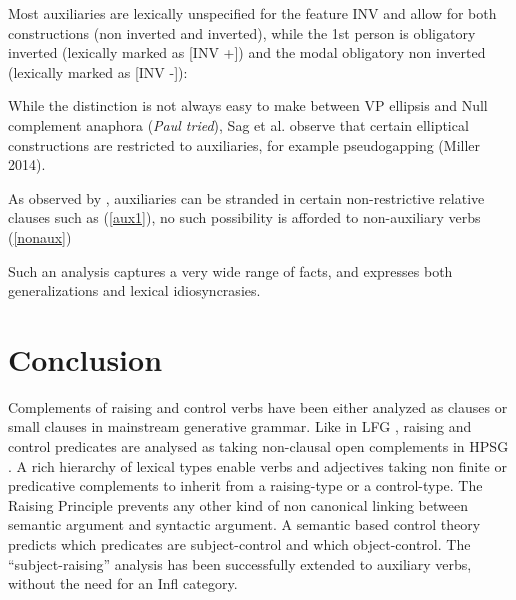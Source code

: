 \documentclass[output=paper]{langsci/langscibook}
\begin{document}
Most auxiliaries are lexically unspecified for the feature INV and allow for both constructions (non inverted and inverted), while the 1st person  is obligatory inverted (lexically marked as [INV +]) and the modal  obligatory non inverted (lexically marked as [INV -]):

\eal
{}
\zl

While the distinction is not always easy to make between VP ellipsis and Null complement anaphora (\textit{Paul tried}), Sag et al. observe that certain elliptical constructions are restricted to auxiliaries, for example pseudogapping (Miller 2014).

\eal
{}
\zl

As observed by \citet{ArnoldandBorsley2008}, auxiliaries can be stranded in certain non-restrictive relative clauses such as (\ref{aux1}), no such possibility is afforded to non-auxiliary verbs (\ref{nonaux})

\eal
{}
\zl

Such an analysis captures a very wide range of facts, and expresses both generalizations and lexical idiosyncrasies.


	
\section{Conclusion}
Complements of raising and control verbs have been either analyzed as clauses \citep{Chomsky1981} or small clauses \citep{Stowell1981,Stowell1983} in mainstream generative grammar.
Like in LFG \citet{Bresnan1982}, raising and control predicates are analysed as taking non-clausal open complements in HPSG \citet{PollardandSag1994}. A rich hierarchy of lexical types enable verbs and adjectives taking non finite or predicative complements to inherit from a raising-type or a control-type. The Raising Principle prevents any other kind of non canonical linking between semantic argument and syntactic argument. A semantic based control theory predicts which predicates are subject-control and which object-control. The ``subject-raising'' analysis has been successfully extended to auxiliary verbs, without the need for an Infl category.





\printbibliography[heading=subbibliography,notkeyword=this] 
\end{document}
